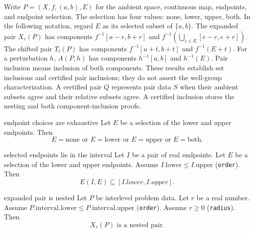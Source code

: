 Write $P=(X,f,(a,b),E)$ for the ambient space, continuous map, endpoints,
and endpoint selection. The selection has four values: none, lower, upper, both.
In the following notation, regard $E$ as its selected subset of $\{a,b\}$.
The expanded pair $X_r(P)$ has components $f^{-1}[a-r,b+r]$ and
$f^{-1}(\bigcup_{e\in E}[e-r,e+r])$.
The shifted pair $T_t(P)$ has components $f^{-1}[a+t,b+t]$ and $f^{-1}(E+t)$.
For a perturbation $h$, $A(P,h)$ has components $h^{-1}[a,b]$ and $h^{-1}(E)$.
Pair inclusion means inclusion of both components. These results establish
set inclusions and certified pair inclusions; they do not assert the well-group characterization.
A certified pair $Q$ represents pair data $S$ when their ambient subsets agree
and their relative subsets agree. A certified inclusion stores the nesting
and both component-inclusion proofs.

\begin{cleanresult}{endpoint choices are exhaustive}
Let $E$ be a selection of the lower and upper endpoints.
Then \[E=\text{none}\text{ or }E=\text{lower}\text{ or }E=\text{upper}\text{ or }E=\text{both}.\]
\end{cleanresult}

\begin{cleanresult}{selected endpoints lie in the interval}
Let $I$ be a pair of real endpoints.
Let $E$ be a selection of the lower and upper endpoints.
Assume $I.\mathrm{lower}\le I.\mathrm{upper}$ (\texttt{order}).
Then \[E(I,E)\subseteq [I.lower,I.upper].\]
\par{}
\end{cleanresult}

\begin{cleanresult}{expanded pair is nested}
Let $P$ be interlevel problem data.
Let $r$ be a real number.
Assume $P.\mathrm{interval}.\mathrm{lower}\le P.\mathrm{interval}.\mathrm{upper}$ (\texttt{order}).
Assume $r\ge 0$ (\texttt{radius}).
Then \[X_{r}(P)\text{ is a nested pair}.\]
\par{}
\end{cleanresult}

